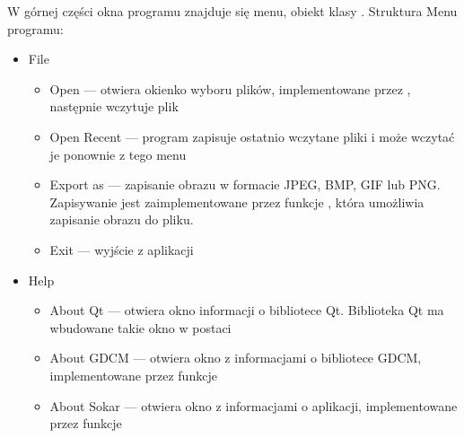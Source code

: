 \par
W górnej części okna programu znajduje się menu, obiekt klasy .
Struktura Menu programu:
\begin{itemize}
    \item File
          \begin{itemize}
              \item Open --- otwiera okienko wyboru plików, implementowane przez , następnie wczytuje plik
              \item Open Recent --- program zapisuje ostatnio wczytane pliki i może wczytać je ponownie z tego menu
              \item Export as --- zapisanie obrazu w formacie JPEG, BMP, GIF lub PNG.
                    Zapisywanie jest zaimplementowane przez funkcje , która umożliwia zapisanie obrazu do pliku.
              \item Exit --- wyjście z aplikacji
          \end{itemize}
    \item Help
          \begin{itemize}
              \item About Qt --- otwiera okno informacji o bibliotece Qt.
              Biblioteka Qt ma wbudowane takie okno w postaci 
              \item About GDCM --- otwiera okno z informacjami o bibliotece GDCM, implementowane przez funkcje 
              \item About Sokar --- otwiera okno z informacjami o aplikacji, implementowane przez funkcje 
          \end{itemize}
\end{itemize}